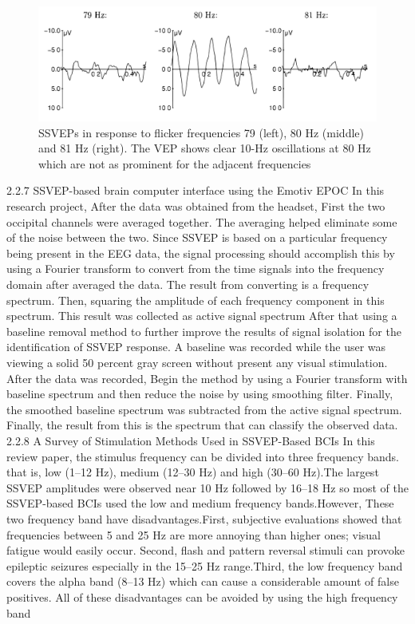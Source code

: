 \begin{figure}[h]
	\centering
  	\includegraphics[scale = 0.25]{picture/28.pdf}
  	\caption{ SSVEPs in response to flicker frequencies 79 (left), 80 Hz (middle) and 81 Hz (right). The VEP shows clear 10-Hz oscillations at 80 Hz which are not as prominent for the adjacent frequencies}
\end{figure}


2.2.7 SSVEP-based brain computer interface using the Emotiv EPOC\cite{ssv}
In this research project, After the data was obtained from the headset, First the two occipital channels were averaged together. The averaging helped eliminate some of the noise between the two. Since SSVEP is based on a particular frequency being present in the EEG data, the signal processing should accomplish this by using a Fourier transform to convert from the time signals into the frequency domain after averaged the data. The result from converting is a frequency spectrum. Then, squaring the amplitude of each frequency component in this spectrum. This result was collected as active signal spectrum      After that using a baseline removal method to further improve the results of signal isolation for the identification of SSVEP response. A baseline was recorded while the user was viewing a solid 50 percent gray screen without present any visual stimulation. After the data was recorded, Begin the method by using a Fourier transform with baseline spectrum and then reduce the noise by using smoothing filter. Finally, the smoothed baseline spectrum was subtracted from the active signal spectrum. Finally, the result from this is the spectrum that can classify the observed data.\\ 

2.2.8 A Survey of Stimulation Methods Used in SSVEP-Based BCIs\cite{sur}
In this review paper, the stimulus frequency can be divided into three frequency bands. that is, low (1–12 Hz), medium (12–30 Hz) and high (30–60 Hz).The largest SSVEP amplitudes were observed near 10 Hz followed by 16–18 Hz so most of the SSVEP-based BCIs used the low and medium frequency bands.However, These two frequency band have disadvantages.First, subjective evaluations showed that frequencies between 5 and 25 Hz are more annoying than higher ones; visual fatigue would easily occur. Second, flash and pattern reversal stimuli can
provoke epileptic seizures especially in the 15–25 Hz range.Third, the low frequency band covers the alpha band (8–13 Hz) which can cause a considerable amount of false positives. All of these disadvantages can be avoided by using the high frequency band    